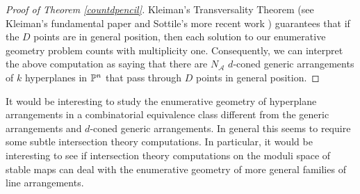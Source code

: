 \documentclass[12pt]{article}
\theoremstyle{plain}
\theoremstyle{definition}
\newtheorem{example}[theorem]{Example}
\newcommand{\A}{\mathcal{A}}
\newcommand{\M}{\mathcal{M}}
\renewcommand{\L}{\mathcal{L}}
\newcommand{\MLA}{\M_{\A}}
\renewcommand{\P}{\ensuremath \mathbb{P}}
\begin{document}
\begin{proof}[Proof of Theorem \ref{countdpencil}]

Kleiman's Transversality Theorem (see Kleiman's fundamental paper \cite{Kleiman} and
Sottile's more recent work \cite{Sottile}) guarantees that if the $D$ points are in
general position, then each solution to our enumerative geometry
problem counts with multiplicity one. Consequently, we can interpret
the above computation as saying that there are $N_\A$ 
$d$-coned generic arrangements of $k$ hyperplanes in $\P^n$ that pass through $D$ points in
general position. \end{proof}










It would be interesting to study the enumerative geometry of
hyperplane arrangements in a combinatorial equivalence class different
from the generic arrangements and $d$-coned generic arrangements. In general this seems
to require some subtle intersection theory computations. In
particular, it would be interesting to see if intersection theory
computations on the moduli space of stable maps can deal with the
enumerative geometry of more general families of line arrangements.


\end{document}
